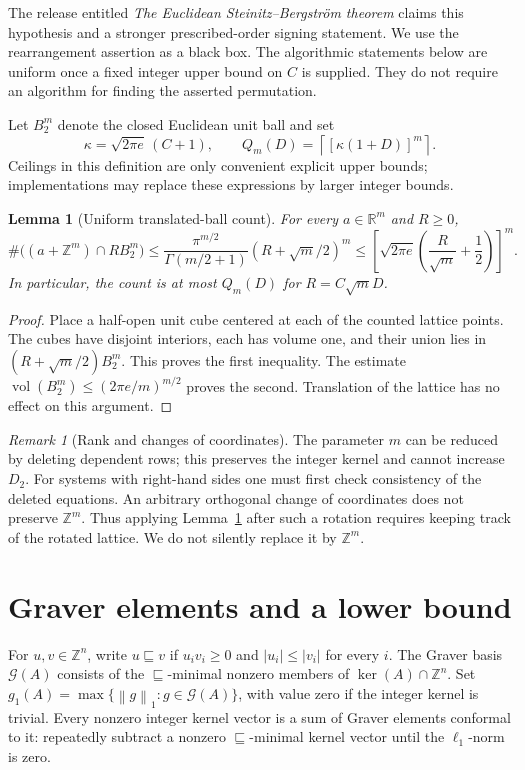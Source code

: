 \documentclass[11pt]{article}
\newtheorem{lemma}[theorem]{Lemma}
\theoremstyle{definition}
\theoremstyle{remark}
\newtheorem{remark}[theorem]{Remark}
\newcommand{\R}{\mathbb R}
\newcommand{\Z}{\mathbb Z}
\newcommand{\G}{\mathcal G}
\newcommand{\norm}[1]{\left\lVert #1\right\rVert}
\DeclareMathOperator{\vol}{vol}
\begin{document}
The release entitled \emph{The Euclidean Steinitz--Bergstr\"om theorem}
\cite{ES2026} claims this hypothesis and a stronger prescribed-order
signing statement. We use the rearrangement assertion as a black box.
The algorithmic statements below are uniform once a fixed integer upper
bound on $C$ is supplied. They do not require an algorithm for finding
the asserted permutation.

Let $B_2^m$ denote the closed Euclidean unit ball and set
\[
 \kappa=\sqrt{2\pi e}\,(C+1),\qquad
 Q_m(D)=\left\lceil[\kappa(1+D)]^m\right\rceil.
 \tag{1}\label{eq:Q}
\]
Ceilings in this definition are only convenient explicit upper bounds;
implementations may replace these expressions by larger integer bounds.

\begin{lemma}[Uniform translated-ball count]\label{lem:count}
For every $a\in\R^m$ and $R\ge0$,
\[
 \#\big((a+\Z^m)\cap RB_2^m\big)
 \le \frac{\pi^{m/2}}{\Gamma(m/2+1)}(R+\sqrt m/2)^m
 \le \left[\sqrt{2\pi e}\left(\frac R{\sqrt m}+\frac12\right)\right]^m.
 \tag{2}\label{eq:count}
\]
In particular, the count is at most $Q_m(D)$ for $R=C\sqrt m D$.
\end{lemma}
\begin{proof}
Place a half-open unit cube centered at each of the counted lattice points.
The cubes have disjoint interiors, each has volume one, and their union
lies in $(R+\sqrt m/2)B_2^m$. This proves the first inequality.
The estimate $\vol(B_2^m)\le(2\pi e/m)^{m/2}$ proves the second.
Translation of the lattice has no effect on this argument.
\end{proof}

\begin{remark}[Rank and changes of coordinates]
The parameter $m$ can be reduced by deleting dependent rows; this preserves
the integer kernel and cannot increase $D_2$. For systems with right-hand
sides one must first check consistency of the deleted equations. An
arbitrary orthogonal change of coordinates does not preserve $\Z^m$.
Thus applying Lemma~\ref{lem:count} after such a rotation requires keeping
track of the rotated lattice. We do not silently replace it by $\Z^m$.
\end{remark}

\section{Graver elements and a lower bound}

For $u,v\in\Z^n$, write $u\sqsubseteq v$ if $u_i v_i\ge0$ and
$|u_i|\le|v_i|$ for every $i$. The Graver basis $\G(A)$ consists of the
$\sqsubseteq$-minimal nonzero members of $\ker(A)\cap\Z^n$.
Set $g_1(A)=\max\{\norm g_1:g\in\G(A)\}$, with value zero if the
integer kernel is trivial. Every nonzero integer kernel vector is a sum
of Graver elements conformal to it: repeatedly subtract a nonzero
$\sqsubseteq$-minimal kernel vector until the $\ell_1$-norm is zero.
\end{document}
